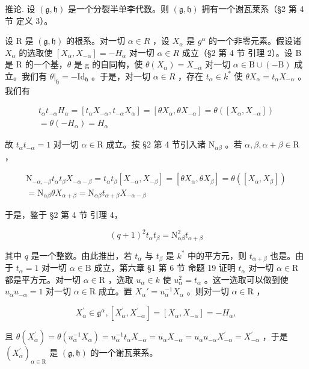 推论. 设 \((\mathfrak{g},\mathfrak{h})\) 是一个分裂半单李代数。则 \((\mathfrak{g},\mathfrak{h})\) 拥有一个谢瓦莱系（§2 第 4 节 定义 3）。

设 R 是 \((\mathfrak{g},\mathfrak{h})\) 的根系。对一切 \(\alpha\in R\) ，设 \(X_{\alpha}\) 是 \(g^{\alpha}\) 的一个非零元素。假设诸 \(X_{\alpha}\) 的选取使 \([X_{\alpha},X_{-\alpha}]=-H_{\alpha}\) 对一切 \(\alpha\in R\) 成立（§2 第 4 节 引理 2）。设 B 是 R 的一个基，\(\theta\) 是 g 的自同构，使 \(\theta(X_{\alpha})=X_{-\alpha}\) 对一切 \(\alpha\in\mathrm{B}\cup(-\mathrm{B})\) 成立。我们有 \(\theta|_{\mathfrak{h}}=-\mathrm{Id}_{\mathfrak{h}}\) 。于是，对一切 \(\alpha\in R\) ，存在 \(t_{\alpha}\in k^{*}\) 使 \(\theta X_{\alpha}=t_{\alpha}X_{-\alpha}\) 。我们有

\[
\begin{array}{c} t _ {\alpha} t _ {- \alpha} H _ {\alpha} = [ t _ {\alpha} X _ {- \alpha}, t _ {- \alpha} X _ {\alpha} ] = [ \theta X _ {\alpha}, \theta X _ {- \alpha} ] = \theta ([ X _ {\alpha}, X _ {- \alpha} ]) \\ = \theta (- H _ {\alpha}) = H _ {\alpha} \end{array}
\]

故 \(t_{\alpha}t_{-\alpha} = 1\) 对一切 \(\alpha \in \mathrm{R}\) 成立。按 §2 第 4 节引入诸 \(\mathrm{N}_{\alpha \beta}\) 。若 \(\alpha, \beta, \alpha + \beta \in \mathrm{R}\) ，

\[
\begin{array}{r} \mathrm{N} _ {- \alpha , - \beta} t _ {\alpha} t _ {\beta} X _ {- \alpha - \beta} = t _ {\alpha} t _ {\beta} [ X _ {- \alpha}, X _ {- \beta} ] = [ \theta X _ {\alpha}, \theta X _ {\beta} ] = \theta ([ X _ {\alpha}, X _ {\beta} ]) \\ = \mathrm{N} _ {\alpha \beta} \theta X _ {\alpha + \beta} = \mathrm{N} _ {\alpha \beta} t _ {\alpha + \beta} X _ {- \alpha - \beta} \end{array}
\]

于是，鉴于 §2 第 4 节 引理 4，

\[
(q + 1) ^ {2} t _ {\alpha} t _ {\beta} = \mathrm{N} _ {\alpha \beta} ^ {2} t _ {\alpha + \beta}
\]

其中 \(q\) 是一个整数。由此推出，若 \(t_{\alpha}\) 与 \(t_{\beta}\) 是 \(k^*\) 中的平方元，则 \(t_{\alpha + \beta}\) 也是。由于 \(t_{\alpha} = 1\) 对一切 \(\alpha \in \mathrm{B}\) 成立，第六章 §1 第 6 节 命题 19 证明 \(t_{\alpha}\) 对一切 \(\alpha \in \mathrm{R}\) 都是平方元。对一切 \(\alpha \in \mathrm{R}\) ，选取 \(u_{\alpha} \in k\) 使 \(u_{\alpha}^{2} = t_{\alpha}\) 。这一选取可以做到使 \(u_{\alpha}u_{-\alpha} = 1\) 对一切 \(\alpha \in \mathrm{R}\) 成立。置 \(X_{\alpha}' = u_{\alpha}^{-1}X_{\alpha}\) 。则对一切 \(\alpha \in \mathrm{R}\) ，

\[
X _ {\alpha} ^ {\prime} \in \mathfrak {g} ^ {\alpha}, [ X _ {\alpha} ^ {\prime}, X _ {- \alpha} ^ {\prime} ] = [ X _ {\alpha}, X _ {- \alpha} ] = - H _ {\alpha},
\]

且 \(\theta(X_{\alpha}^{\prime}) = \theta(u_{\alpha}^{-1}X_{\alpha}) = u_{\alpha}^{-1}t_{\alpha}X_{-\alpha} = u_{\alpha}X_{-\alpha} = u_{\alpha}u_{-\alpha}X_{-\alpha}^{\prime} = X_{-\alpha}^{\prime}\) ，于是 \((X_{\alpha}^{\prime})_{\alpha \in \mathrm{R}}\) 是 \((\mathfrak{g},\mathfrak{h})\) 的一个谢瓦莱系。

